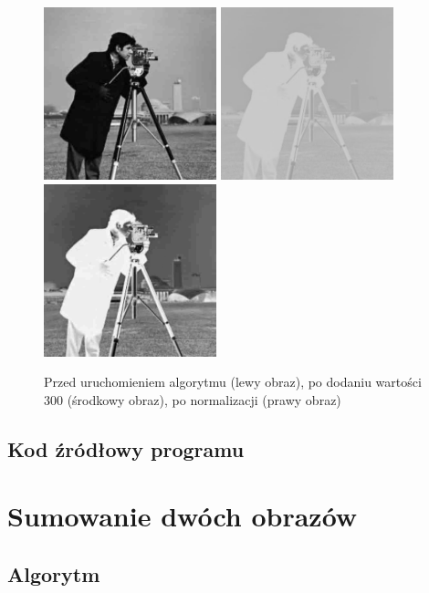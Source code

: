\documentclass[a4paper,12pt]{book}
\begin{document}
\begin{figure}[H]
	\caption{Przed uruchomieniem algorytmu (lewy obraz), po dodaniu wartości 300 (środkowy obraz), po normalizacji (prawy obraz)}
	\includegraphics[width=5cm, height=5cm]{man-unmodified.jpg}
	\includegraphics[width=5cm, height=5cm]{2/sum-gray-const-300-2.png}
	\includegraphics[width=5cm, height=5cm]{2/sum-gray-const-300-norm-2.png}
\end{figure}

\subsection*{Kod źródłowy programu}

\section{Sumowanie dwóch obrazów}
\subsection*{Algorytm}
\end{document}
